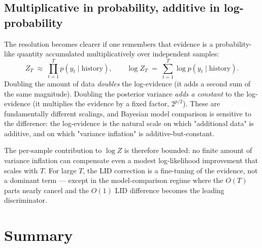 \documentclass[11pt]{article}
\begin{document}
\subsection{Multiplicative in probability, additive in log-probability}

The resolution becomes clearer if one remembers that evidence is a probability-like quantity accumulated multiplicatively over independent samples:
\begin{equation}
Z_T \;\approx\; \prod_{t=1}^T p(y_t \mid \text{history}),
\qquad
\log Z_T \;=\; \sum_{t=1}^T \log p(y_t \mid \text{history}).
\end{equation}
Doubling the amount of data \emph{doubles} the log-evidence (it adds a second sum of the same magnitude). Doubling the posterior variance \emph{adds a constant} to the log-evidence (it multiplies the evidence by a fixed factor, $2^{p/2}$). These are fundamentally different scalings, and Bayesian model comparison is sensitive to the difference: the log-evidence is the natural scale on which "additional data" is additive, and on which "variance inflation" is additive-but-constant.

The per-sample contribution to $\log Z$ is therefore bounded: no finite amount of variance inflation can compensate even a modest log-likelihood improvement that scales with $T$. For large $T$, the LID correction is a fine-tuning of the evidence, not a dominant term --- except in the model-comparison regime where the $O(T)$ parts nearly cancel and the $O(1)$ LID difference becomes the leading discriminator.

\section{Summary}
\label{sec:summary}
\end{document}
